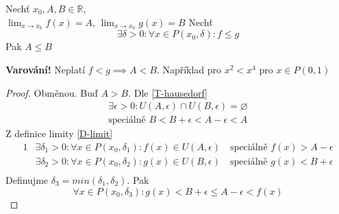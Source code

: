 \begin{theorem}
    Nechť $x_0, A, B\in\mathbb{R}$, \\
    $\lim_{x\to x_0}f(x)=A$, $\lim_{x\to x_0}g(x)=B$ Nechť
    \begin{equation}
        \exists\delta>0:\forall x\in P(x_0,\delta):f\leq g
    \end{equation}
    Pak $A\leq B$

    \textbf{Varování!} Neplatí $f<g\implies A<B$. Například pro $x^2<x^4 \text{ pro }x\in P(0,1)$
\end{theorem}
\begin{proof}
    Obměnou. Buď $A>B$. Dle \autoref{T-hausedorf}
    \begin{gather}
        \exists\epsilon>0:U(A,\epsilon)\cap U(B,\epsilon)=\varnothing \\
        \text{speciálně }B<B+\epsilon<A-\epsilon<A
    \end{gather}
    Z definice limity \autoref{D-limit}
    \begin{alignat}{1}
        &\exists\delta_1>0:\forall x\in P(x_0,\delta_1):f(x)\in U(A,\epsilon)
            \quad\text{speciálně }f(x)>A-\epsilon \\
        &\exists\delta_2>0:\forall x\in P(x_0,\delta_2):g(x)\in U(B,\epsilon)
            \quad\text{speciálně }g(x)<B+\epsilon \\
    \end{alignat}
    Definujme $\delta_3=min(\delta_1,\delta_2)$. Pak
    \begin{equation}
        \forall x\in P(x_0,\delta_3):g(x)<B+\epsilon\leq A-\epsilon<f(x)
    \end{equation}
\end{proof}

